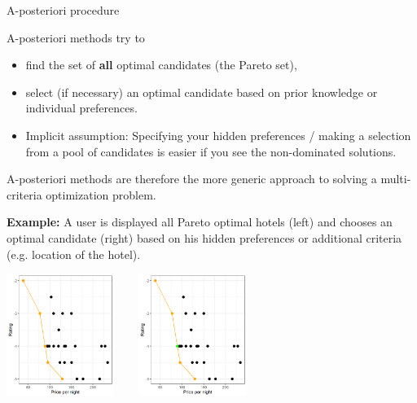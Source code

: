 \documentclass[11pt,compress,t,notes=noshow, xcolor=table]{beamer}
\begin{document}
\begin{vbframe}{A-posteriori procedure}

A-posteriori methods try to

\begin{itemize}
\item find the set of \textbf{all} optimal candidates (the Pareto set),
\item select (if necessary) an optimal candidate based on prior knowledge or individual preferences.
\item Implicit assumption: Specifying your hidden preferences / making a selection from a pool of candidates is easier if you see the non-dominated solutions.
\end{itemize}

A-posteriori methods are therefore the more generic approach to solving a multi-criteria optimization problem.

\framebreak

\textbf{Example:} A user is displayed all Pareto optimal hotels (left) and chooses an optimal candidate (right) based on his hidden preferences or additional criteria (e.g. location of the hotel).

\vspace*{0.3cm}

\lz
\begin{center}
\includegraphics[height=4cm, width =0.35\linewidth]{figure_man/posteriori1.png} ~~~ \includegraphics[height=4cm, width =0.35\linewidth]{figure_man/posteriori2.png}
\end{center}

\end{vbframe}


\endlecture
\end{document}
